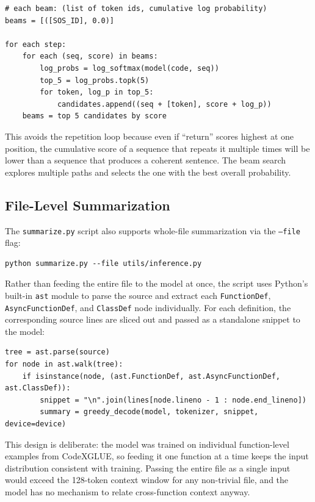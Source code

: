 \documentclass[11pt]{article}
\begin{document}
\begin{lstlisting}[style=python]
# each beam: (list of token ids, cumulative log probability)
beams = [([SOS_ID], 0.0)]

for each step:
    for each (seq, score) in beams:
        log_probs = log_softmax(model(code, seq))
        top_5 = log_probs.topk(5)
        for token, log_p in top_5:
            candidates.append((seq + [token], score + log_p))
    beams = top 5 candidates by score
\end{lstlisting}

This avoids the repetition loop because even if ``return'' scores highest at one position, the cumulative score of a sequence that repeats it multiple times will be lower than a sequence that produces a coherent sentence. The beam search explores multiple paths and selects the one with the best overall probability.

\subsection{File-Level Summarization}

The \texttt{summarize.py} script also supports whole-file summarization via the \texttt{--file} flag:

\begin{lstlisting}[style=plain]
python summarize.py --file utils/inference.py
\end{lstlisting}

Rather than feeding the entire file to the model at once, the script uses Python's built-in \texttt{ast} module to parse the source and extract each \texttt{FunctionDef}, \texttt{AsyncFunctionDef}, and \texttt{ClassDef} node individually. For each definition, the corresponding source lines are sliced out and passed as a standalone snippet to the model:

\begin{lstlisting}[style=python]
tree = ast.parse(source)
for node in ast.walk(tree):
    if isinstance(node, (ast.FunctionDef, ast.AsyncFunctionDef, ast.ClassDef)):
        snippet = "\n".join(lines[node.lineno - 1 : node.end_lineno])
        summary = greedy_decode(model, tokenizer, snippet, device=device)
\end{lstlisting}

This design is deliberate: the model was trained on individual function-level examples from CodeXGLUE, so feeding it one function at a time keeps the input distribution consistent with training. Passing the entire file as a single input would exceed the 128-token context window for any non-trivial file, and the model has no mechanism to relate cross-function context anyway.
\end{document}
